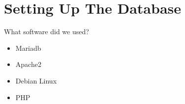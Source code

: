 \section{Setting Up The Database}
    
    \frame{\sectionpage}
    
    \begin{frame}{What software did we used?}
		\begin{itemize}
			\item Mariadb
			\pause
			\item Apache2
			\pause
			\item Debian Linux
			\pause
			\item PHP
		\end{itemize}
	\end{frame}